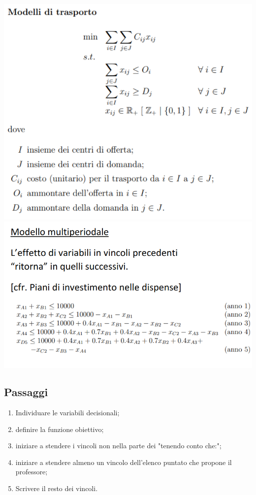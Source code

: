 \begin{multicols}{2}
\includegraphics[width=\linewidth]{img/trasporti.png}
\includegraphics[width=\linewidth]{img/multiperiodale.png}

\end{multicols}
\subsection{Passaggi}
\begin{enumerate}
    \item Individuare le variabili decisionali;
    \item definire la funzione obiettivo;
    \item iniziare a stendere i vincoli non nella parte dei "tenendo conto che:";
    \item iniziare a stendere almeno un vincolo dell'elenco puntato che propone il professore;
    \item Scrivere il resto dei vincoli.
\end{enumerate}

